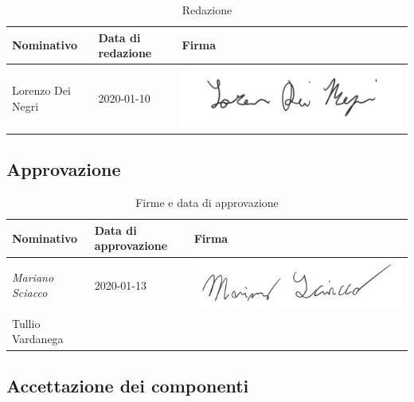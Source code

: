 			\begin{table}[!h]
				\centering
					\begin{tabular}{|l|l|l|}
						\hline
						\textbf{Nominativo} & \textbf{Data di redazione} & \textbf{Firma} \\ \hline
						Lorenzo Dei Negri & 2020-01-10 &  \includegraphics[scale=0.6]{images/firme/lorenzo} \\ \hline
					\end{tabular}
				\caption{Redazione}
			\end{table}
		
		\subsection{Approvazione}
			
			\begin{table}[!h]
				\centering
				\begin{tabular}{|l|l|l|}
					\hline
					\textbf{Nominativo} & \textbf{Data di approvazione} & \textbf{Firma} \\ \hline
					\textit{Mariano Sciacco} & 2020-01-13 &  \includegraphics[scale=0.6]{images/firme/mariano}  \\ \hline
					Tullio Vardanega &  & \\ \hline
				\end{tabular}
				\caption{Firme e data di approvazione}
			\end{table}
			
		\subsection{Accettazione dei componenti}
			
